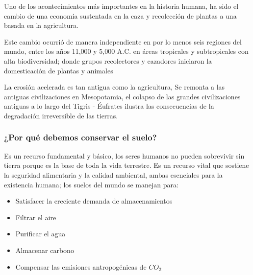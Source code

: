 Uno de los acontecimientos más importantes en la historia humana, ha sido el cambio de una economía sustentada en la caza y recolección de plantas a una basada en la agricultura.

Este cambio ocurrió de manera independiente en por lo menos seis regiones del mundo, entre los años 11,000 y 5,000 A.C. en áreas tropicales y subtropicales con alta biodiversidad; donde grupos recolectores y cazadores iniciaron la domesticación de plantas y animales

La erosión acelerada es tan antigua como  la agricultura, Se remonta a las antiguas civilizaciones en Mesopotamia, el colapso de las grandes civilizaciones antiguas a lo largo del Tigris - Éufrates ilustra las consecuencias de la degradación irreversible de las tierras.

\subsubsection{¿Por qué debemos conservar el suelo?}
Es un recurso fundamental y básico, los seres humanos no pueden sobrevivir sin tierra porque es la base de toda la vida terrestre. Es un recurso vital que sostiene la seguridad alimentaria y la calidad ambiental, ambas esenciales para la existencia humana; los suelos del mundo se manejan para:
\begin{itemize}
    \item Satisfacer la creciente demanda de almacenamientos
    \item Filtrar el aire
    \item Purificar el agua 
    \item Almacenar carbono
    \item Compensar las emisiones antropogénicas de $CO_2$
\end{itemize}
